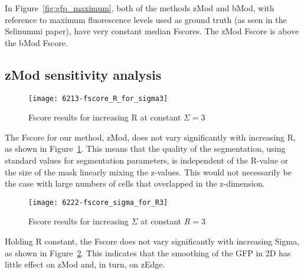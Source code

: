In Figure~\ref{fig:gfp_maximum}, both of the methods zMod and bMod, with reference to maximum fluorescence levels used as ground truth (as seen in the Selinummi paper), have very constant median Fscores. The zMod Fscore is above the bMod Fscore.

\subsection{zMod sensitivity analysis}

\begin{figure}[htbp!]
\centering
\texttt{[image: 6213-fscore\_R\_for\_sigma3]}
\caption{Fscore results for increasing R at constant $\Sigma=3$}
\label{fig:fscore_sigma3}
\end{figure}

The Fscore for our method, zMod, does not vary significantly with increasing R, as shown in Figure~\ref{fig:fscore_sigma3}. This means that the quality of the segmentation, using standard values for segmentation parameters, is independent of the R-value or the size of the mask linearly mixing the z-values. This would not necessarily be the case with large numbers of cells that overlapped in the z-dimension.

\begin{figure}[htbp!]
\centering
\texttt{[image: 6222-fscore\_sigma\_for\_R3]}
\caption{Fscore results for increasing $\Sigma$ at constant $R=3$}
\label{fig:fscore_r3}
\end{figure}

Holding R constant, the Fscore does not vary significantly with increasing Sigma, as shown in Figure~\ref{fig:fscore_r3}. This indicates that the smoothing of the GFP in 2D has little effect on zMod and, in turn, on zEdge.

